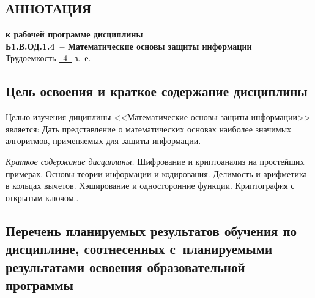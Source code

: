 \documentclass[a4paper,12pt]{article}
\begin{document}
\newpage


\begin{center}
\section{АННОТАЦИЯ}
  {\bf к рабочей программе дисциплины\\
  Б1.В.ОД.1.4\ -- Математические основы защиты информации} \\
  Трудоемкость \uline{~4~} з.~е.
\end{center}


\subsection{Цель освоения и краткое содержание дисциплины}
  
  Целью изучения дициплины <<Математические основы защиты информации>> является: Дать представление о математических основах наиболее значимых алгоритмов, применяемых для защиты информации.
  
  
  \textit{Краткое содержание дисциплины.} Шифрование и криптоанализ на простейших примерах. Основы теории информации и кодирования. Делимость и арифметика в кольцах вычетов. Хэширование и односторонние функции. Криптография с открытым ключом..
  
  



\subsection{Перечень планируемых результатов обучения по дисциплине, соотнесенных с~планируемыми результатами освоения образовательной программы}
\end{document}
